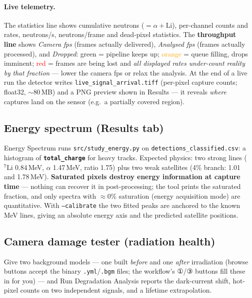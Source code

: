 \documentclass[11pt,a4paper]{article}
\newcommand{\param}[1]{\texttt{\textbf{#1}}}
\newcommand{\gui}[1]{\textsf{#1}}
\begin{document}
\paragraph{Live telemetry.} The statistics line shows cumulative neutrons
($= \alpha + \mathrm{Li}$), per-channel counts and rates, neutrons/s,
neutrons/frame and dead-pixel statistics. The \textbf{throughput line} shows
\emph{Camera fps} (frames actually delivered), \emph{Analysed fps} (frames
actually processed), and \emph{Dropped}: \textcolor{green!50!black}{green} =
pipeline keeps up; \textcolor{orange}{orange} = queue filling, drops
imminent; \textcolor{red}{red} = frames are being lost and \emph{all
displayed rates under-count reality by that fraction} --- lower the camera
fps or relax the analysis. At the end of a live run the detector writes
\texttt{live\_signal\_arrival.tiff} (per-pixel capture counts; float32,
$\sim$80\,MB) and a PNG preview shown in \gui{Results} --- it reveals
\emph{where} captures land on the sensor (e.g.\ a partially covered region).

\subsection{Energy spectrum (Results tab)}
\gui{Energy Spectrum} runs \texttt{src/study\_energy.py} on
\texttt{detections\_classified.csv}: a histogram of \param{total\_charge}
for heavy tracks. Expected physics: two strong lines
($^{7}\mathrm{Li}$ 0.84\,MeV, $\alpha$ 1.47\,MeV, ratio 1.75) plus two weak
satellites (4\% branch: 1.01 and 1.78\,MeV). \textbf{Saturated pixels
destroy energy information at capture time} --- nothing can recover it in
post-processing; the tool prints the saturated fraction, and only spectra
with $\approx 0\%$ saturation (energy acquisition mode) are quantitative.
With \texttt{--calibrate} the two fitted peaks are anchored to the known
MeV lines, giving an absolute energy axis and the predicted satellite
positions.

\subsection{Camera damage tester (radiation health)}
Give two background models --- one built \emph{before} and one \emph{after}
irradiation (browse buttons accept the binary \texttt{.yml}/\texttt{.bgm}
files; the workflow's ①/③ buttons fill these in for you) --- and \gui{Run
Degradation Analysis} reports the dark-current shift, hot-pixel counts on
two independent signals, and a lifetime extrapolation.
\end{document}
